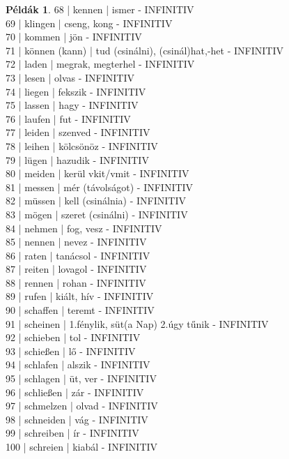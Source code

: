 \documentclass{article}
\theoremstyle{definition}
\newtheorem*{exmp}{Példák}
\begin{document}
\begin{exmp}
68 | kennen | ismer - INFINITIV\\
69 | klingen | cseng, kong - INFINITIV\\
70 | kommen | jön - INFINITIV\\
71 | können (kann) | tud (csinálni), (csinál)hat,-het - INFINITIV\\
72 | laden | megrak, megterhel  - INFINITIV\\
73 | lesen | olvas - INFINITIV\\
74 | liegen | fekszik - INFINITIV\\
75 | lassen | hagy - INFINITIV\\
76 | laufen | fut - INFINITIV\\
77 | leiden | szenved - INFINITIV\\
78 | leihen | kölcsönöz - INFINITIV\\
79 | lügen | hazudik - INFINITIV\\
80 | meiden  | kerül vkit/vmit - INFINITIV\\
81 | messen | mér (távolságot) - INFINITIV\\
82 | müssen | kell (csinálnia) - INFINITIV\\
83 | mögen | szeret (csinálni) - INFINITIV\\
84 | nehmen | fog, vesz - INFINITIV\\
85 | nennen | nevez - INFINITIV\\
86 | raten | tanácsol - INFINITIV\\
87 | reiten | lovagol - INFINITIV\\
88 | rennen | rohan - INFINITIV\\
89 | rufen | kiált, hív - INFINITIV\\
90 | schaffen | teremt - INFINITIV\\
91 | scheinen | 1.fénylik, süt(a Nap) 2.úgy tűnik - INFINITIV\\
92 | schieben | tol - INFINITIV\\
93 | schießen | lő - INFINITIV\\
94 | schlafen | alszik - INFINITIV\\
95 | schlagen | üt, ver - INFINITIV\\
96 | schließen | zár - INFINITIV\\
97 | schmelzen | olvad - INFINITIV\\
98 | schneiden | vág - INFINITIV\\
99 | schreiben | ír - INFINITIV\\
100 | schreien | kiabál - INFINITIV\\

\end{exmp}
\end{document}
